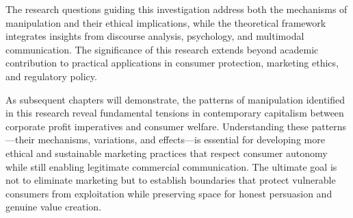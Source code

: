 The research questions guiding this investigation address both the mechanisms of manipulation and their ethical implications, while the theoretical framework integrates insights from discourse analysis, psychology, and multimodal communication. The significance of this research extends beyond academic contribution to practical applications in consumer protection, marketing ethics, and regulatory policy.

As subsequent chapters will demonstrate, the patterns of manipulation identified in this research reveal fundamental tensions in contemporary capitalism between corporate profit imperatives and consumer welfare. Understanding these patterns—their mechanisms, variations, and effects—is essential for developing more ethical and sustainable marketing practices that respect consumer autonomy while still enabling legitimate commercial communication. The ultimate goal is not to eliminate marketing but to establish boundaries that protect vulnerable consumers from exploitation while preserving space for honest persuasion and genuine value creation.